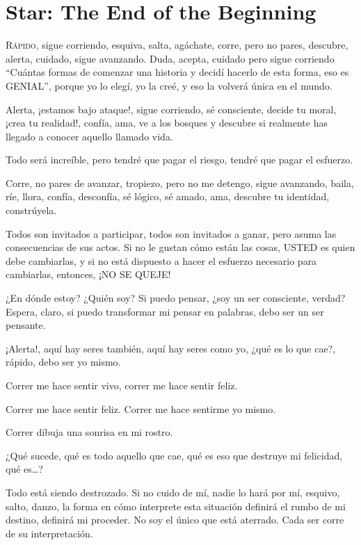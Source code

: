 \renewcommand{\chaptertitlename}{Chapter}
\chapter{Star: The End of the Beginning}
\renewcommand{\chaptertitlename}{Capítulo}


\lettrine{R}{ápido}, sigue corriendo, esquiva, salta, agáchate, corre, pero no pares, descubre, alerta, cuidado, sigue avanzando. Duda, acepta, cuidado pero sigue corriendo ``Cuántas formas de comenzar una historia y decidí hacerlo de esta forma, eso es GENIAL'', porque yo lo elegí, yo la creé, y eso la volverá única en el mundo.

Alerta, ¡estamos bajo ataque!, sigue corriendo, sé consciente, decide tu moral, ¡crea tu realidad!, confía, ama, ve a los bosques y descubre si realmente has llegado a conocer aquello llamado vida.

Todo será increíble, pero tendré que pagar el riesgo, tendré que pagar el esfuerzo.

Corre, no pares de avanzar, tropiezo, pero no me detengo, sigue avanzando, baila, ríe, llora, confía, desconfía, sé lógico, sé amado, ama, descubre tu identidad, constrúyela.

Todos son invitados a participar, todos son invitados a ganar, pero asuma las consecuencias de sus actos. Si no le gustan cómo están las cosas, USTED es quien debe cambiarlas, y si no está dispuesto a hacer el esfuerzo necesario para cambiarlas, entonces, ¡NO SE QUEJE!

¿En dónde estoy? ¿Quién soy? Si puedo pensar, ¿soy un ser consciente, verdad? Espera, claro, si puedo transformar mi pensar en palabras, debo ser un ser pensante.

¡Alerta!, aquí hay seres también, aquí hay seres como yo, ¿qué es lo que cae?, rápido, debo ser yo mismo.

Correr me hace sentir vivo, correr me hace sentir feliz.

Correr me hace sentir feliz.
Correr me hace sentirme yo mismo.

Correr dibuja una sonrisa en mi rostro.

¿Qué sucede, qué es todo aquello que cae, qué es eso que destruye mi felicidad, qué es\ldots?

Todo está siendo destrozado. Si no cuido de mí, nadie lo hará por mí, esquivo, salto, danzo, la forma en cómo interprete esta situación definirá el rumbo de mi destino, definirá mi proceder. No soy el único que está aterrado. Cada ser corre de su interpretación.

